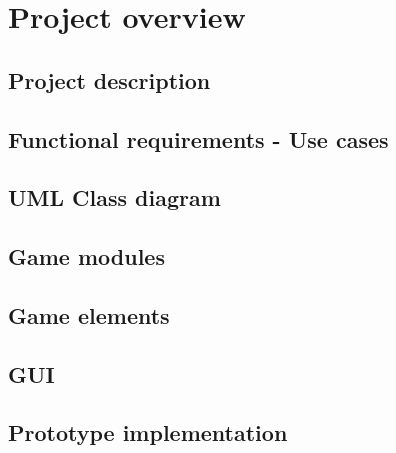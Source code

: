 \chapter{Project overview}\label{chapter:project}


\section{Project description}
\section{Functional requirements - Use cases}
\section{UML Class diagram}
\section{Game modules}
\section{Game elements}
\section{GUI}
\section{Prototype implementation}
